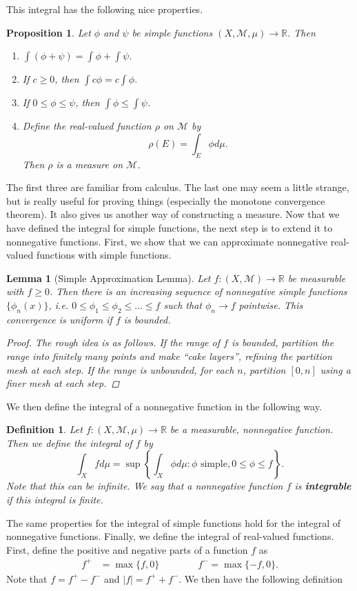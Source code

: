 \documentclass[12pt]{amsart}         %
\newtheorem{definition}{Definition}[section]
\newtheorem{proposition}{Proposition}[section]
\newtheorem{lemma}{Lemma}[section]
\theoremstyle{remark}
\newcommand{\R}{\mathbb{R}}
\begin{document}
This integral has the following nice properties. 

\begin{proposition}
Let $\phi$ and $\psi$ be simple functions $(X, \mathcal{M}, \mu) \rightarrow \R$. Then
\begin{enumerate}
\item $\int (\phi + \psi) = \int \phi + \int \psi$.
\item If $c \geq 0$, then $\int c \phi = c \int \phi$.
\item If $0 \leq \phi \leq \psi$, then $\int \phi \leq \int \psi$.
\item Define the real-valued function $\rho$ on $\mathcal{M}$ by 
\[
\rho(E) = \int_E \phi d\mu.
\]
Then $\rho$ is a measure on $\mathcal{M}$.
\end{enumerate}
\end{proposition}

The first three are familiar from calculus. The last one may seem a little strange, but is really useful for proving things (especially the monotone convergence theorem). It also gives us another way of constructing a measure. Now that we have defined the integral for simple functions, the next step is to extend it to nonnegative functions. First, we show that we can approximate nonnegative real-valued functions with simple functions.

\begin{lemma}[Simple Approximation Lemma]
Let $f: (X,\mathcal{M}) \rightarrow \R$ be measurable with $f \geq 0$. Then there is an increasing sequence of nonnegative simple functions $\{ \phi_n(x) \} $, i.e. $0 \leq \phi_1 \leq \phi_2 \leq \dots \leq f$ such that $\phi_n \rightarrow f$ pointwise. This convergence is uniform if $f$ is bounded.
\begin{proof}
The rough idea is as follows. If the range of $f$ is bounded, partition the range into finitely many points and make ``cake layers'', refining the partition mesh at each step. If the range is unbounded, for each $n$, partition $[0, n]$ using a finer mesh at each step.
\end{proof}
\end{lemma}

We then define the integral of a nonnegative function in the following way.

\begin{definition}
Let $f:(X, \mathcal{M}, \mu) \rightarrow \R$ be a measurable, nonnegative function. Then we define the integral of $f$ by
\[
\int_X fd\mu =\sup\left\{ \int_X \phi d\mu : \phi \text{  simple}, 0\leq\phi\leq f \right\}.
\]
Note that this can be infinite. We say that a nonnegative function $f$ is \textbf{integrable} if this integral is finite.
\end{definition}
The same properties for the integral of simple functions hold for the integral of nonnegative functions. Finally, we define the integral of real-valued functions. First, define the positive and negative parts of a function $f$ as 
\begin{align*}
f^+ &= \max\{f,0\} \qquad \qquad
f^- = \max\{-f,0\}.
\end{align*}
Note that $f = f^+ - f^-$ and $|f| = f^+ + f^-$. We then have the following definition 
\end{document}
